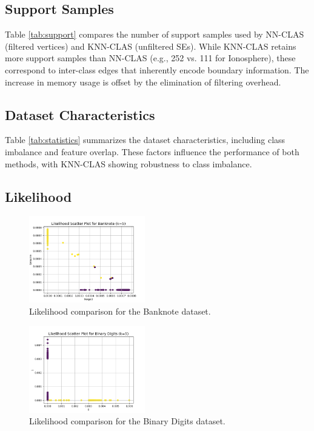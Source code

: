 \documentclass[conference]{IEEEtran}
\begin{document}
\subsection{Support Samples}

Table \ref{tab:support} compares the number of support samples used by NN-CLAS (filtered vertices) and KNN-CLAS (unfiltered SEs). While KNN-CLAS retains more support samples than NN-CLAS (e.g., 252 vs. 111 for Ionosphere), these correspond to inter-class edges that inherently encode boundary information. The increase in memory usage is offset by the elimination of filtering overhead.

\subsection{Dataset Characteristics}

Table \ref{tab:statistics} summarizes the dataset characteristics, including class imbalance and feature overlap. These factors influence the performance of both methods, with KNN-CLAS showing robustness to class imbalance.

\subsection{Likelihood}

\begin{figure}[H]
    \centering
    \includegraphics[width=0.45\textwidth]{../scripts/comparison_results/Banknote_likelihood.png}
    \caption{Likelihood comparison for the Banknote dataset.}
    \label{fig:banknote_likelihood}
\end{figure}

\begin{figure}[H]
    \centering
    \includegraphics[width=0.45\textwidth]{../scripts/comparison_results/Binary Digits_likelihood.png}
    \caption{Likelihood comparison for the Binary Digits dataset.}
    \label{fig:binary_digits_likelihood}
\end{figure}
\end{document}
